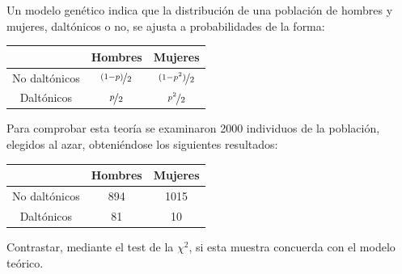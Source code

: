 \begin{ejercicio}
    Un modelo genético indica que la distribución de una población de hombres y mujeres, daltónicos o no, se ajusta a probabilidades de la forma:
    \begin{table}[H]
    \centering
    \begin{tabular}{|c|c|c|}
        \hline
        & Hombres & Mujeres \\
        \hline
        No daltónicos & $\nicefrac{(1-p)}{2}$ & $\nicefrac{(1-p^2)}{2}$ \\
        \hline
        Daltónicos & $\nicefrac{p}{2}$ & $\nicefrac{p^2}{2}$ \\
        \hline
    \end{tabular}
    \end{table}
   \noindent
    Para comprobar esta teoría se examinaron 2000 individuos de la población, elegidos al azar, obteniéndose los siguientes resultados:
    \begin{table}[H]
    \centering
    \begin{tabular}{|c|c|c|}
        \hline
        & Hombres & Mujeres \\
        \hline
        No daltónicos & 894 & 1015 \\
        \hline
        Daltónicos & 81 & 10 \\
        \hline
    \end{tabular}
    \end{table}
   \noindent
    Contrastar, mediante el test de la $\chi^2$, si esta muestra concuerda con el modelo teórico.
\end{ejercicio}

